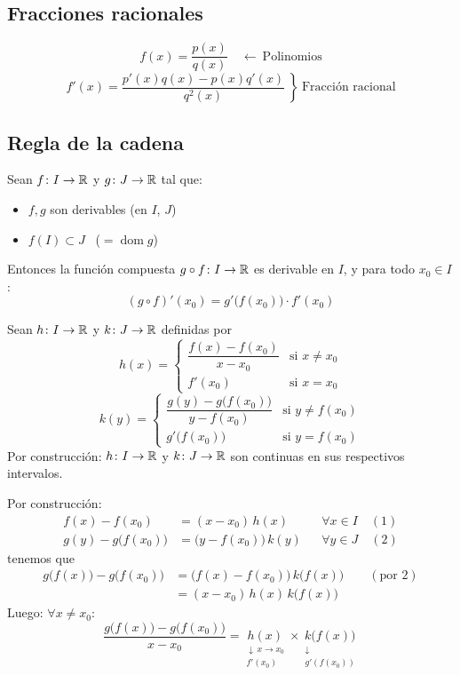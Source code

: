 \documentclass[11pt,a4paper]{article}
\newcommand{\abajo}[3][]{\underset{\substack{\downarrow\,#1\\ #3}}{#2}}
\begin{document}
\subsection{Fracciones racionales}

\[
  f(x)=\frac{p(x)}{q(x)}\quad\longleftarrow\ \text{Polinomios}
\]
\[
  \left.f'(x)=\frac{p'(x)q(x)-p(x)q'(x)}{q^2(x)}\ \right\}
  \ \text{Fracción racional}
\]

\subsection{Regla de la cadena}

\begin{proposicion}
  Sean $f\colon I\to\mathbb{R}$ y $g\colon J\to\mathbb{R}$ tal que:
  \begin{itemize}
    \item[--] $f,g$ son derivables (en $I$, $J$)
    \item[--] $f(I)\subset J$ \ ($=\operatorname{dom}g$)
  \end{itemize}
  Entonces la función compuesta $g\circ f\colon I\to\mathbb{R}$ es derivable en
  $I$, y para todo $x_0\in I$:
  \[
    (g\circ f)'(x_0)=g'\bigl(f(x_0)\bigr)\cdot f'(x_0)
  \]
\end{proposicion}

\begin{demo}
  Sean $h\colon I\to\mathbb{R}$ y $k\colon J\to\mathbb{R}$ definidas por
  \[
    h(x)=\begin{cases}
      \dfrac{f(x)-f(x_0)}{x-x_0} & \text{si } x\neq x_0\\[2ex]
      f'(x_0) & \text{si } x=x_0
    \end{cases}
  \]
  \[
    k(y)=\begin{cases}
      \dfrac{g(y)-g\bigl(f(x_0)\bigr)}{y-f(x_0)} & \text{si } y\neq f(x_0)\\[2ex]
      g'\bigl(f(x_0)\bigr) & \text{si } y=f(x_0)
    \end{cases}
  \]
  Por construcción: $h\colon I\to\mathbb{R}$ y $k\colon J\to\mathbb{R}$ son continuas en
  sus respectivos intervalos.

  Por construcción:
  \begin{align*}
    f(x)-f(x_0)&=(x-x_0)\,h(x) && \forall x\in I \quad (1)\\
    g(y)-g\bigl(f(x_0)\bigr)&=\bigl(y-f(x_0)\bigr)\,k(y) && \forall y\in J \quad (2)
  \end{align*}
  tenemos que
  \begin{align*}
    g\bigl(f(x)\bigr)-g\bigl(f(x_0)\bigr)
    &=\bigl(f(x)-f(x_0)\bigr)\,k\bigl(f(x)\bigr) \qquad (\text{por } 2)\\
    &=(x-x_0)\,h(x)\,k\bigl(f(x)\bigr)
  \end{align*}
  Luego: $\forall x\neq x_0$:
  \[
    \frac{g\bigl(f(x)\bigr)-g\bigl(f(x_0)\bigr)}{x-x_0}
    =\abajo[x\to x_0]{h(x)}{f'(x_0)}
    \times\abajo{k\bigl(f(x)\bigr)}{g'(f(x_0))}
  \]
\end{demo}
\end{document}
